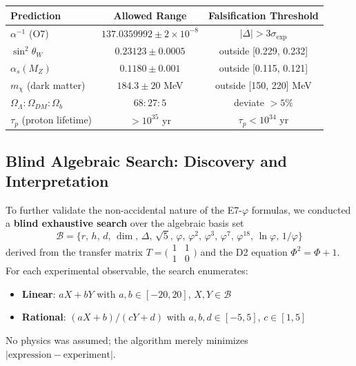 \documentclass[11pt,a4paper]{article}
\begin{document}
\begin{center}
\begin{tabular}{|l|c|c|}
\hline
\textbf{Prediction} & \textbf{Allowed Range} & \textbf{Falsification Threshold} \\
\hline
$\alpha^{-1}$ (O7) & $137.0359992 \pm 2 \times 10^{-8}$ & $|\Delta| > 3\sigma_{\exp}$ \\
$\sin^2\theta_W$ & $0.23123 \pm 0.0005$ & outside [0.229, 0.232] \\
$\alpha_s(M_Z)$ & $0.1180 \pm 0.001$ & outside [0.115, 0.121] \\
$m_\chi$ (dark matter) & $184.3 \pm 20$ MeV & outside [150, 220] MeV \\
$\Omega_\Lambda : \Omega_{DM} : \Omega_b$ & $68 : 27 : 5$ & deviate $> 5\%$ \\
$\tau_p$ (proton lifetime) & $> 10^{35}$ yr & $\tau_p < 10^{34}$ yr \\
\hline
\end{tabular}
\end{center}

\subsection{Blind Algebraic Search: Discovery and Interpretation}
\label{sec:blind-search}

To further validate the non-accidental nature of the E7-$\varphi$ formulas, we conducted a \textbf{blind exhaustive search} over the algebraic basis set
\begin{equation}
\mathcal{B} = \{r,\, h,\, d,\, \dim,\, \Delta,\, \sqrt{5},\, \varphi,\, \varphi^2,\, \varphi^3,\, \varphi^7,\, \varphi^{18},\, \ln\varphi,\, 1/\varphi\}
\end{equation}
derived from the transfer matrix $T = \bigl(\begin{smallmatrix}1&1\\1&0\end{smallmatrix}\bigr)$ and the D2 equation $\Phi^2 = \Phi + 1$. For each experimental observable, the search enumerates:
\begin{itemize}
\item \textbf{Linear}: $a X + b Y$ with $a,b \in [-20,20]$, $X,Y \in \mathcal{B}$
\item \textbf{Rational}: $(aX + b)/(cY + d)$ with $a,b,d \in [-5,5]$, $c \in [1,5]$
\end{itemize}
No physics was assumed; the algorithm merely minimizes $|\text{expression} - \text{experiment}|$.
\end{document}
